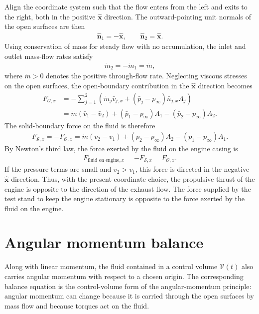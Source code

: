 \begin{example}
    Align the coordinate system such that the flow enters from the left and exits to the right, both in the positive $\bm{\hat{x}}$ direction. The outward-pointing unit normals of the open surfaces are then
    \begin{align*}
        \bm{\hat{n}}_1=-\bm{\hat{x}},
        \qquad
        \bm{\hat{n}}_2=\bm{\hat{x}}.
    \end{align*}
    Using conservation of mass for steady flow with no accumulation, the inlet and outlet mass-flow rates satisfy
    \begin{align*}
        \dot{m}_2=-\dot{m}_1=\dot{m},
    \end{align*}
    where $\dot{m}>0$ denotes the positive through-flow rate. Neglecting viscous stresses on the open surfaces, the open-boundary contribution in the $\bm{\hat{x}}$ direction becomes
    \begin{align*}
        F_{\mathcal{O},x}&=-\sum_{j=1}^{2}\left(\dot{m}_j\bar{v}_{j,x}+(\bar{p}_j-p_\infty)\bar{n}_{j,x}A_j\right)\\
        &=\dot{m}(\bar{v}_1-\bar{v}_2)+(\bar{p}_1-p_\infty)A_1-(\bar{p}_2-p_\infty)A_2.
    \end{align*}
    The solid-boundary force on the fluid is therefore
    \begin{align*}
        F_{\mathcal{S},x}=-F_{\mathcal{O},x}=\dot{m}(\bar{v}_2-\bar{v}_1)+(\bar{p}_2-p_\infty)A_2-(\bar{p}_1-p_\infty)A_1.
    \end{align*}
    By Newton's third law, the force exerted by the fluid on the engine casing is
    \begin{align*}
        F_{\text{fluid on engine},x}=-F_{\mathcal{S},x}=F_{\mathcal{O},x}.
    \end{align*}
    If the pressure terms are small and $\bar{v}_2>\bar{v}_1$, this force is directed in the negative $\bm{\hat{x}}$ direction. Thus, with the present coordinate choice, the propulsive thrust of the engine is opposite to the direction of the exhaust flow. The force supplied by the test stand to keep the engine stationary is opposite to the force exerted by the fluid on the engine.
\end{example}

\section{Angular momentum balance}
Along with linear momentum, the fluid contained in a control volume
\(\mathcal{V}(t)\) also carries angular momentum with respect to a chosen
origin. The corresponding balance equation is the control-volume form of
the angular-momentum principle: angular momentum can change because it is
carried through the open surfaces by mass flow and because torques act on
the fluid.

